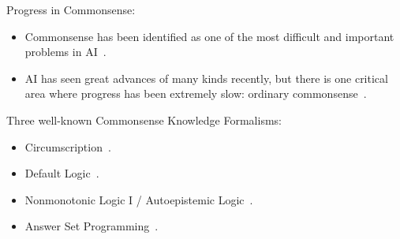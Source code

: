 \begin{frame}
 Progress in Commonsense:
  \begin{itemize}
   \item Commonsense has been identified as one of the most difficult and important problems in AI~\cite{Doyle:1984:AIM}.

    \item AI has seen great advances of many kinds
recently, but there is one critical area
where progress has been extremely slow:
ordinary commonsense~\cite{DBLP:journals/cacm/DavisM15}.
  \end{itemize}

  {Three well-known Commonsense Knowledge Formalisms:}
  \begin{itemize}
    \item Circumscription~\cite{DBLP:journals/ai/McCarthy80}.

    \item Default Logic~\cite{Reiter1980}.

    \item Nonmonotonic Logic I / Autoepistemic Logic~\cite{DBLP:journals/ai/McDermottD80,Moore:aij85}.

    \item Answer Set Programming~\cite{GelfondLifschitz88}.
  \end{itemize}


\end{frame}


